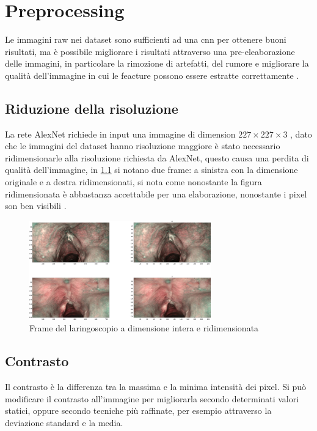 \chapter{Preprocessing}\label{preprocessing}

Le immagini raw nei dataset sono sufficienti ad una \gls{cnn} per ottenere buoni risultati, ma è possibile migliorare i risultati attraverso una pre-eleaborazione delle immagini, in particolare la rimozione di artefatti,  del rumore e migliorare la qualità dell'immagine 
in cui le feacture  possono essere estratte correttamente \cite{permual_contrast}.

\section{Riduzione della risoluzione}\label{riduzione-della-risoluzione}

La rete AlexNet richiede in input una immagine di dimension \(227 \times 227 \times 3\) \cite{alexnet}, dato che le immagini del dataset hanno risoluzione maggiore è stato necessario ridimensionarle alla risoluzione richiesta da AlexNet, questo causa una perdita di qualità dell'immagine, in \cref{fig:resize} si notano due frame: a sinistra con la dimensione originale e a destra ridimensionati, si nota come nonostante la figura ridimensionata è abbastanza accettabile per una elaborazione, nonostante i pixel son ben visibili \cite{gonzalez_dip}.

\begin{figure}[ht]
    \centering
    \includegraphics[width=0.7\textwidth]{preprocessing/resize.pdf}
    \caption{Frame del laringoscopio a dimensione intera e ridimensionata}
    \label{fig:resize}
\end{figure}

\section{Contrasto}\label{contrasto}

Il contrasto è la differenza tra la massima e la minima
intensità dei pixel. Si può modificare il contrasto all'immagine per migliorarla secondo determinati valori statici, oppure secondo tecniche più raffinate, per esempio attraverso la deviazione standard e la media. 

